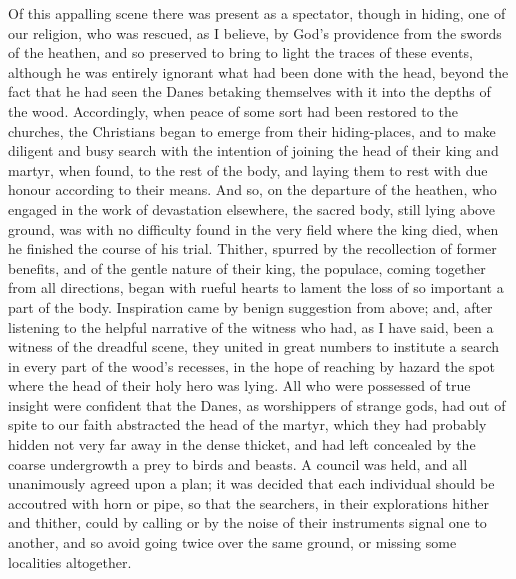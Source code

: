 \documentclass[10pt]{book}
\begin{document}
\begin{paracol}{2}
Of this appalling scene there was present as a spectator, though in hiding, one of our religion, who was rescued, as I believe, by God's providence from the swords of the heathen, and so preserved to bring to light the traces of these events, although he was entirely ignorant what had been done with the head, beyond the fact that he had seen the Danes betaking themselves with it into the depths of the wood. Accordingly, when peace of some sort had been restored to the churches, the Christians began to emerge from their hiding-places, and to make diligent and busy search with the intention of joining the head of their king and martyr, when found, to the rest of the body, and laying them to rest with due honour according to their means. And so, on the departure of the heathen, who engaged in the work of devastation elsewhere, the sacred body, still lying above ground, was with no difficulty found in the very field where the king died, when he finished the course of his trial. Thither, spurred by the recollection of former benefits, and of the gentle nature of their king, the populace, coming together from all directions, began with rueful hearts to lament the loss of so important a part of the body. Inspiration came by benign suggestion from above; and, after listening to the helpful narrative of the witness who had, as I have said, been a witness of the dreadful scene, they united in great numbers to institute a search in every part of the wood's recesses, in the hope of reaching by hazard the spot where the head of their holy hero was lying. All who were possessed of true insight were confident that the Danes, as worshippers of strange gods, had out of spite to our faith abstracted the head of the martyr, which they had probably hidden not very far away in the dense thicket, and had left concealed by the coarse undergrowth a prey to birds and beasts. A council was held, and all unanimously agreed upon a plan; it was decided that each individual should be accoutred with horn or pipe, so that the searchers, in their explorations hither and thither, could by calling or by the noise of their instruments signal one to another, and so avoid going twice over the same ground, or missing some localities altogether.

\switchcolumn*


\end{paracol}
\end{document}
